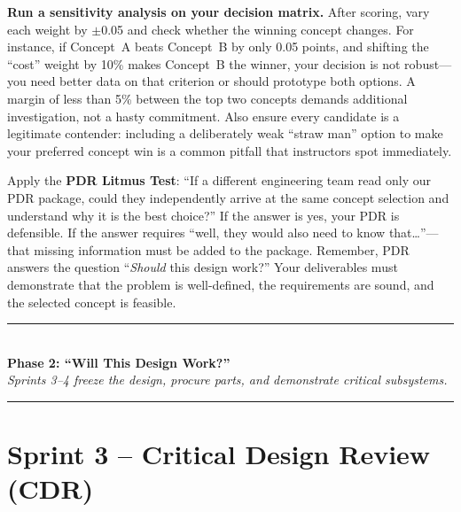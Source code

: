 \documentclass[11pt,letterpaper]{article}
\begin{document}
\begin{protip}
\textbf{Run a sensitivity analysis on your decision matrix.} After scoring, vary each weight by $\pm$0.05 and check whether the winning concept changes. For instance, if Concept~A beats Concept~B by only 0.05 points, and shifting the ``cost'' weight by 10\% makes Concept~B the winner, your decision is not robust---you need better data on that criterion or should prototype both options. A margin of less than 5\% between the top two concepts demands additional investigation, not a hasty commitment. Also ensure every candidate is a legitimate contender: including a deliberately weak ``straw man'' option to make your preferred concept win is a common pitfall that instructors spot immediately.
\end{protip}

\begin{faqbox}
Apply the \textbf{PDR Litmus Test}: ``If a different engineering team read only our PDR package, could they independently arrive at the same concept selection and understand why it is the best choice?'' If the answer is yes, your PDR is defensible. If the answer requires ``well, they would also need to know that\ldots''---that missing information must be added to the package. Remember, PDR answers the question ``\textit{Should} this design work?'' Your deliverables must demonstrate that the problem is well-defined, the requirements are sound, and the selected concept is feasible.
\end{faqbox}

\vspace{0.5em}
\begin{center}
\textcolor{minesblue}{\rule{0.6\textwidth}{1pt}}\\[4pt]
{\Large\bfseries\sffamily\color{minesblue} Phase 2: ``Will This Design Work?''}\\[2pt]
{\small\itshape Sprints 3--4 freeze the design, procure parts, and demonstrate critical subsystems.}\\[4pt]
\textcolor{minesblue}{\rule{0.6\textwidth}{1pt}}
\end{center}
\vspace{0.5em}
\section{Sprint 3 -- Critical Design Review (CDR)}
\end{document}
